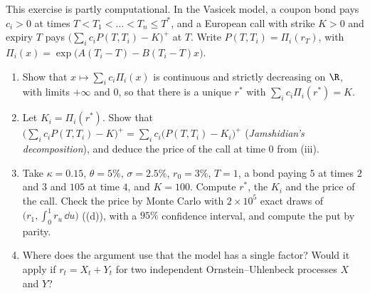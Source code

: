 \begin{exercise}\label{ex:ir-jamshidian}
\hard This exercise is partly computational. In the Vasicek model, a coupon bond pays $c_i>0$ at times
$T<T_1<\dots<T_n\le T^*$, and a European call with strike $K>0$ and expiry $T$ pays
$\big(\sum_ic_iP(T,T_i)-K\big)^+$ at $T$. Write $P(T,T_i)=\Pi_i(r_T)$, with
$\Pi_i(x)=\exp\big(A(T_i-T)-B(T_i-T)x\big)$.
\begin{enumerate}[label=(\alph*)]
  \item Show that $x\mapsto\sum_ic_i\Pi_i(x)$ is continuous and strictly decreasing on $\R$, with limits
    $+\infty$ and $0$, so that there is a unique $r^*$ with $\sum_ic_i\Pi_i(r^*)=K$.
  \item Let $K_i=\Pi_i(r^*)$. Show that
    $\big(\sum_ic_iP(T,T_i)-K\big)^+=\sum_ic_i\big(P(T,T_i)-K_i\big)^+$ (\emph{Jamshidian's decomposition}),
    and deduce the price of the call at time $0$ from (iii).
  \item Take $\kappa=0.15$, $\theta=5\%$, $\sigma=2.5\%$, $r_0=3\%$, $T=1$, a bond paying $5$ at times $2$
    and $3$ and $105$ at time $4$, and $K=100$. Compute $r^*$, the $K_i$ and the price of the call.
    Check the price by Monte Carlo with $2\times10^5$ exact draws of $\big(r_1,\int_0^1r_u\,\dd u\big)$
    ((d)), with a $95\%$ confidence interval, and compute the put by
    parity.
  \item Where does the argument use that the model has a single factor? Would it apply if
    $r_t=X_t+Y_t$ for two independent Ornstein--Uhlenbeck processes $X$ and $Y$?
\end{enumerate}
\end{exercise}


